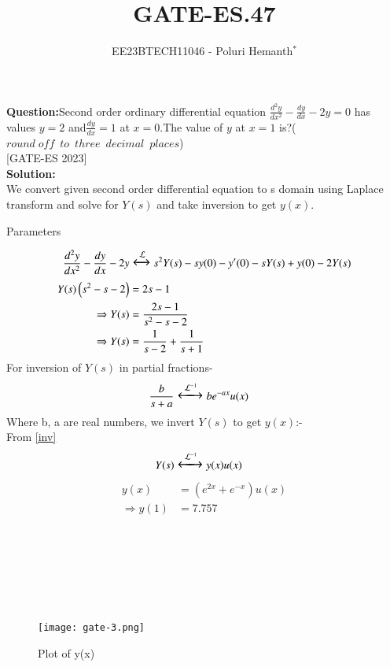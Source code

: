 \documentclass[journal,12pt,twocolumn]{IEEEtran}
\theoremstyle{remark}
\begin{document}

\vspace{3cm}

\title{GATE-ES.47}
\author{EE23BTECH11046 - Poluri Hemanth$^{*}$}
\maketitle
\textbf{Question:}Second order ordinary differential equation $\frac{d^2y}{dx^2}-\frac{dy}{dx}-2y=0$ has values 
$y=2$ and$\frac{dy}{dx}=1$ at $x=0$.The value of $y$ at $x=1$ is?($round\; off\;\: to\;\: three\;\: decimal\;\: places$)
 \\ \hfill[GATE-ES 2023]\\
\textbf{Solution:}\\
We convert given second order differential equation to s domain using Laplace transform and solve for $Y(s)$ and take inversion to get $y(x)$.
\begin{table}[h!]
	
        \caption{Parameters}
        \label{tab:es.47}
\end{table}


\begin{align}
    \frac{d^2y}{dx^2}-\frac{dy}{dx}-2y&\Large\xleftrightarrow{\mathcal{L}}s^2Y(s)-sy(0)-y'(0)-sY(s)+y(0)-2Y(s)\\
	Y(s)\left(s^2-s-2\right)&=2s-1\\
    \Rightarrow Y(s)&=\frac{2s-1}{s^2-s-2}\\
    \Rightarrow Y(s)&=\frac{1}{s-2}+\frac{1}{s+1}
\end{align}
For inversion of $Y(s)$ in partial fractions-
\begin{align}
	&\frac{b}{s+a}\Large\xleftrightarrow{\mathcal{L}^{-1}}be^{-ax}u(x)\label{inv}
\end{align}
Where b, a are real numbers, we invert $Y(s)$ to get $y(x)$:-\\
From \eqref{inv}
\begin{align}
	&Y(s)\Large\xleftrightarrow{\mathcal{L}^{-1}} y(x)u(x)
\end{align}
\begin{align}
	y(x)&=\left(e^{2x}+e^{-x}\right)u(x)\\
   \Rightarrow y(1)&=7.757
\end{align}\\
\\
\\
\\
\\
\\
\begin{figure}
    \centering
    \texttt{[image: gate-3.png]}
	\caption{Plot of y(x)}
    \label{fig:enter-label}
\end{figure}
\end{document}
